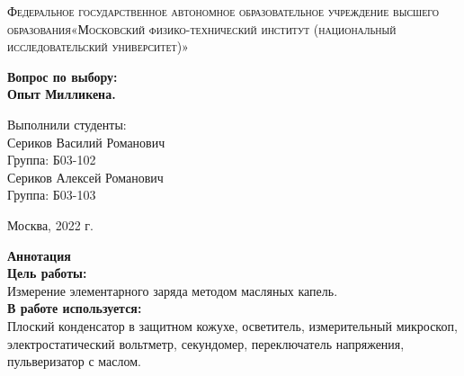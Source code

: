 \documentclass[a4paper, 12pt]{article}%
\begin{document}
	\begin{titlepage}
		\begin{center}
			\textsc{Федеральное государственное автономное образовательное учреждение высшего образования«Московский физико-технический институт (национальный исследовательский университет)»\\[5mm]
			}
			
			\vfill
			
			\textbf{Вопрос по выбору: \\[3mm]
				Опыт Милликена.
				\\[50mm]
			}
			
		\end{center}
		
		\hfill
		\begin{minipage}{.5\textwidth}
			Выполнили студенты:\\[2mm]
			Сериков Василий Романович\\[2mm]
			Группа: Б03-102\\[5mm]
			Сериков Алексей Романович\\[2mm]
			Группа: Б03-103\\[5mm]
			
		\end{minipage}
		\vfill
		\begin{center}
			Москва, 2022 г.
		\end{center}
		
	\end{titlepage}
	
	\newpage
	\textbf{Аннотация}\\
	
	
	\textbf{Цель работы: }\\
	Измерение элементарного заряда методом масляных капель.\\
	
	\textbf{В работе используется: }\\
	Плоский конденсатор в защитном кожухе, осветитель, измерительный микроскоп, электростатический вольтметр, секундомер, переключатель напряжения, пульверизатор с маслом.\\
	
\end{document}
